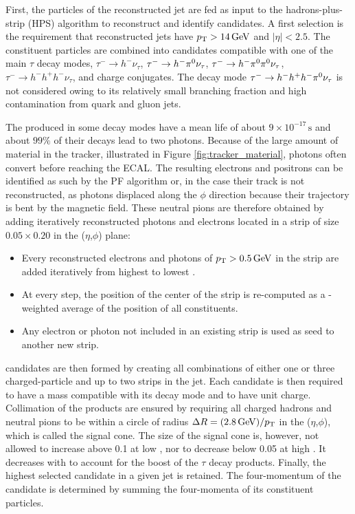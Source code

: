 First, the particles of the reconstructed jet are fed as input to the hadrons-plus-strip (HPS) algorithm \cite{tauh_reconstruction} to reconstruct and identify \tauh candidates. A first selection is the requirement that reconstructed jets have $p_{\mathrm{T}} > 14\,\mathrm{GeV}$ and $|\eta| < 2.5$.
The constituent particles are combined into \tauh candidates compatible with one of the main $\tau$ decay modes, $\tau^- \rightarrow h^- \nu_\tau$, $\tau^- \rightarrow h^- \pi^{0} \nu_\tau$, $\tau^- \rightarrow h^- \pi^{0} \pi^{0} \nu_\tau$, $\tau^- \rightarrow h^- h^+ h^- \nu_\tau$, and charge conjugates. The decay mode $\tau^- \rightarrow h^- h^+ h^- \pi^{0} \nu_\tau$ is not considered owing to its relatively small branching fraction and high contamination from quark and gluon jets.

The \pizero produced in some decay modes have a mean life of about $9 \times 10^{-17}\,\mathrm{s}$ and about $99\%$ of their decays lead to two photons. Because of the large amount of material in the tracker, illustrated in Figure \ref{fig:tracker_material}, photons often convert before reaching the ECAL. The resulting electrons and positrons can be identified as such by the PF algorithm or, in the case their track is not reconstructed, as photons displaced along the $\phi$ direction because their trajectory is bent by the magnetic field.
These neutral pions are therefore obtained by adding iteratively reconstructed photons and electrons located in a strip of size $0.05 \times 0.20$ in the ($\eta$,$\phi$) plane:
\begin{itemize}
    \item Every reconstructed electrons and photons of $p_{\mathrm{T}} > 0.5\,\mathrm{GeV}$ in the strip are added iteratively from highest to lowest \pt.
    \item At every step, the position of the center of the strip is re-computed as a \pt-weighted average of the position of all constituents.
    \item Any electron or photon not included in an existing strip is used as seed to another new strip.
\end{itemize}

\tauh candidates are then formed by creating all combinations of either one or three charged-particle and up to two strips in the jet.
Each \tauh candidate is then required to have a mass compatible with its decay mode and to have unit charge.
Collimation of the products are ensured by requiring all charged hadrons and neutral pions to be within a circle of radius $\Delta R = (2.8\,\mathrm{GeV})/p_{\mathrm{T}}$ in the ($\eta$,$\phi$), which is called the signal cone.
The size of the signal cone is, however, not allowed to increase above 0.1 at low \pt, nor to decrease below 0.05 at high \pt. It decreases with \pt to account for the boost of the $\tau$ decay products. Finally, the highest \pt selected \tauh candidate in a given jet is retained. The four-momentum of the \tauh candidate is determined by summing the four-momenta of its constituent particles.

